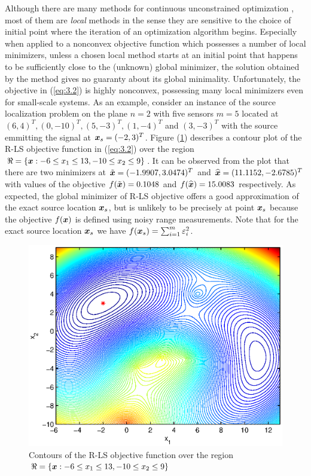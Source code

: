 Although there are many methods for continuous unconstrained optimization \cite{AntonLu}, most of them are \textit{local} methods in the sense they are sensitive to the choice of initial point where the iteration of an optimization algorithm begins. Especially when applied to a nonconvex objective function which possesses a number of local minimizers, unless a chosen local method starts at an initial point that happens to be sufficiently close to the (unknown) global minimizer, the solution obtained by the method gives no guaranty about its global minimality. Unfortunately, the objective in (\ref{eq:3.2}) is highly nonconvex, possessing many local minimizers even for small-scale systems. As an example, consider an instance of the source localization problem on the plane $n = 2$ with five sensors $ m = 5$ located at $(6,4)^T, (0,-10)^T, (5,-3)^T, (1,-4)^T$ and  $(3,-3)^T$ with the source emmitting the signal at $\mbox{\boldmath$x$}_s = (-2,3)^T$. Figure (\ref{fig:ExampleOfRLSNonconvexity}) describes a contour plot of the R-LS objective function in (\ref{eq:3.2}) over the region $\Re = \{\mbox{\boldmath$x$}: -6 \leq x_1 \leq 13, -10 \leq x_2 \leq 9 \}$. It can be observed from the plot that there are two minimizers at $\tilde{\mbox{\boldmath$x$}} = (-1.9907, 3.0474)^T$ and $\widehat{\mbox{\boldmath$x$}} = (11.1152, -2.6785)^T$ with values of the objective  $f(\tilde{\mbox{\boldmath$x$}}) = 0.1048 $ and $f(\widehat{\mbox{\boldmath$x$}}) = 15.0083$ respectively. As expected, the global minimizer of R-LS objective offers a good approximation of the exact source location $\mbox{\boldmath$x$}_s$, but is unlikely to be precisely at point $\mbox{\boldmath$x$}_s$ because the objective $f(\mbox{\boldmath$x$})$ is defined using noisy range measurements. Note that for the exact source location $\mbox{\boldmath$x$}_s$ we have $f(\mbox{\boldmath$x$}_s) = \sum_{i=1}^m \varepsilon_i^2$.

\begin{figure}[t]
\centering
  \includegraphics{figures/nonconvexity_example_ls_new_range}
\caption{Contours of the R-LS objective function over the region $\protect\Re = \protect\lbrace \protect\mbox{\boldmath$x$}:-6\protect\leq x_1 \protect\leq 13, -10\protect\leq x_2 \protect\leq 9 \protect\rbrace$}
\label{fig:ExampleOfRLSNonconvexity}
\end{figure}

